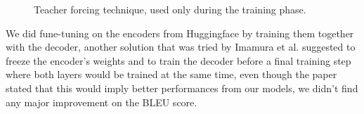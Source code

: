 \begin{figure}[H]
    \centering
    \qquad \qquad
    \caption{Teacher forcing technique, used only during the training phase.}
    \label{fig:teacher_forcing}
\end{figure}
We did fune-tuning on the encoders from Huggingface by training them together with the decoder, another solution that was tried by Imamura et al. \cite{imamura-sumita-2019-recycling} suggested to freeze the encoder's weights and to train the decoder before a final training step where both layers would be trained at the same time, even though the paper stated that this would imply better performances from our models, we didn't find any major improvement on the BLEU score.
